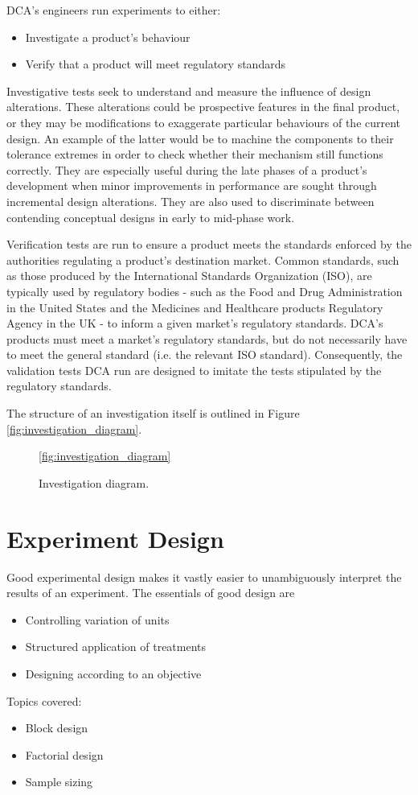 \documentclass[11pt,a4paper,article]{memoir} %
\begin{document}
\par
DCA's engineers run experiments to either:
\begin{itemize}
	\item Investigate a product's behaviour
	\item Verify that a product will meet regulatory standards
\end{itemize}
Investigative tests seek to understand and measure the influence of design alterations. These alterations could be prospective features in the final product, or they may be modifications to exaggerate particular behaviours of the current design. An example of the latter would be to machine the components to their tolerance extremes in order to check whether their mechanism still functions correctly. They are especially useful during the late phases of a product's development when minor improvements in performance are sought through incremental design alterations. They are also used to discriminate between contending conceptual designs in early to mid-phase work.
\par
Verification tests are run to ensure a product meets the standards enforced by the authorities regulating a product's destination market. Common standards, such as those produced by the International Standards Organization (ISO), are typically used by regulatory bodies - such as the Food and Drug Administration in the United States and the Medicines and Healthcare products Regulatory Agency in the UK - to inform a given market's regulatory standards. DCA's products must meet a market's regulatory standards, but do not necessarily have to meet the general standard (i.e. the relevant ISO standard).  Consequently, the validation tests DCA run are designed to imitate the tests stipulated by the regulatory standards.
\par
The structure of an investigation itself is outlined in Figure \ref{fig:investigation_diagram}. 
\begin{figure}
\ref{fig:investigation_diagram}
\caption{Investigation diagram.}
\end{figure}

\section{Experiment Design}
Good experimental design makes it vastly easier to unambiguously interpret the results of an experiment. The essentials of good design are
\begin{itemize}
\item Controlling variation of units
\item Structured application of treatments
\item Designing according to an objective
\end{itemize}
Topics covered:
\begin{itemize}
\item Block design
\item Factorial design
\item Sample sizing
\end{itemize}
\end{document}
